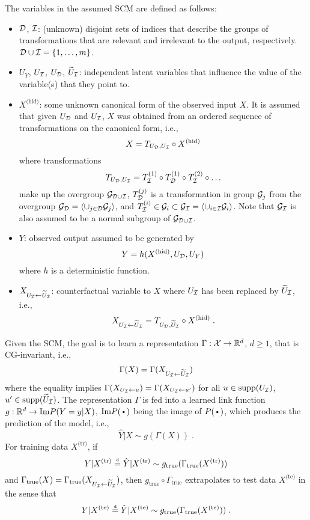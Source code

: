 The variables in the assumed SCM are defined as follows:
\begin{itemize}

\item
$\mathcal{D}$, $\mathcal{I}$: (unknown) disjoint sets of indices that describe the groups of transformations that are relevant and irrelevant to the output, respectively. $\mathcal{D}\cup\mathcal{I}=\{1,\ldots,m\}$.

\item
$U_Y$, $U_{\mathcal{I}}$, $U_{\mathcal{D}}$, $\widetilde{U}_{\mathcal{I}}$: independent latent variables that influence the value of the variable(s) that they point to.

\item
$X^{\text{(hid)}}$: some unknown canonical form of the observed input $X$.  It is assumed that given $U_{\mathcal{D}}$ and $U_{\mathcal{I}}$, $X$ was obtained from an ordered sequence of transformations on the canonical form, i.e.,
\[
X=T_{U_{\mathcal{D}},U_{\mathcal{I}}}\circ X^{\text{(hid)}}
\]
where transformations
\[
T_{U_{\mathcal{D}},U_{\mathcal{I}}}=T_{\mathcal{I}}^{(1)}\circ T_{\mathcal{D}}^{(1)}\circ T_{\mathcal{I}}^{(2)}\circ\ldots
\]
make up the overgroup $\mathcal{G}_{\mathcal{D}\cup\mathcal{I}}$, $T_{\mathcal{D}}^{(j)}$ is a transformation in group $\mathcal{G}_j$ from the overgroup $\mathcal{G}_{\mathcal{D}}=\langle\cup_{j\in\mathcal{D}}\mathcal{G}_j\rangle$, and $T_{\mathcal{I}}^{(i)}\in\mathcal{G}_i\subset\mathcal{G}_{\mathcal{I}}=\langle\cup_{i\in\mathcal{I}}\mathcal{G}_i\rangle$. Note that $\mathcal{G}_{\mathcal{I}}$ is also assumed to be a normal subgroup of $\mathcal{G}_{\mathcal{D}\cup\mathcal{I}}$.

\item
$Y$: observed output assumed to be generated by
\[
Y = h(X^{\text{(hid)}},U_{\mathcal{D}},U_Y)
\]
where $h$ is a deterministic function.

\item
$X_{U_{\mathcal{I}}\leftarrow\widetilde{U}_{\mathcal{I}}}$: counterfactual variable to $X$ where $U_{\mathcal{I}}$ has been replaced by $\widetilde{U}_{\mathcal{I}}$, i.e.,
\[
X_{U_{\mathcal{I}}\leftarrow\widetilde{U}_{\mathcal{I}}} = T_{U_{\mathcal{D}},\widetilde{U}_{\mathcal{I}}}\circ X^{\text{(hid)}} \;.
\]

\end{itemize}

Given the SCM, the goal is to learn a representation $\Gamma:\mathcal{X}\rightarrow\mathbb{R}^d$, $d\geq 1$, that is CG-invariant, i.e.,
\[
\Gamma(X) = \Gamma(X_{U_{\mathcal{I}}\leftarrow\widetilde{U}_{\mathcal{I}}})
\]
where the equality implies $\Gamma(X_{U_{\mathcal{I}}\leftarrow u})=\Gamma(X_{U_{\mathcal{I}}\leftarrow u'})$ for all $u\in\text{\rm supp}(U_{\mathcal{I}})$, $u'\in\text{\rm supp}(\widetilde{U}_{\mathcal{I}})$. The representation $\Gamma$ is fed into a learned link function $g:\mathbb{R}^d\rightarrow \text{Im} P(Y=y|X)$, $\text{Im} P(\argdot)$ being the image of $P(\argdot)$, which produces the prediction of the model, i.e.,
\[
\hat{Y}|X \sim g(\Gamma(X)) \;.
\]
For training data $X^\text{(tr)}$, if
\[
Y|X^\text{(tr)} \stackrel{\text{\rm\tiny d}}{=} \hat{Y}|X^\text{(tr)}\sim g_{\text{true}}(\Gamma_{\text{true}}(X^\text{(tr)}))
\]
and $\Gamma_\text{true}(X) = \Gamma_\text{true}(X_{U_{\mathcal{I}}\leftarrow\widetilde{U}_{\mathcal{I}}})$, then $g_\text{true}\circ\Gamma_\text{true}$ extrapolates to test data $X^\text{(te)}$ in the sense that
\[
Y|X^\text{(te)} \stackrel{\text{\rm\tiny d}}{=} \hat{Y}|X^\text{(te)}\sim g_{\text{true}}(\Gamma_{\text{true}}(X^\text{(te)})) \;.
\]


